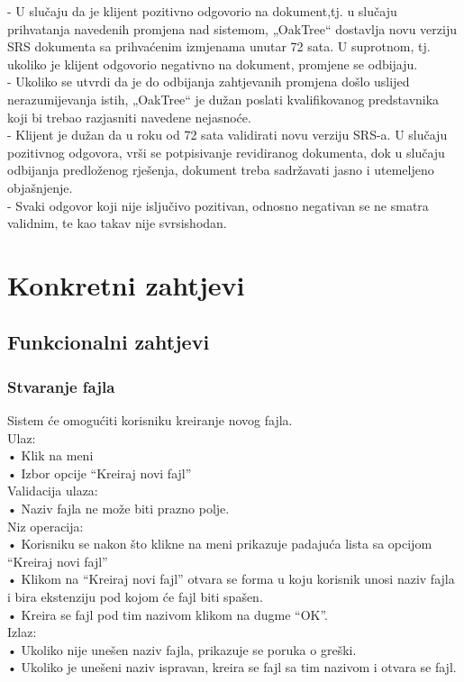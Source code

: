 \documentclass[utf8]{article}
\begin{document}
- U slučaju da  je klijent pozitivno odgovorio na dokument,tj. u slučaju prihvatanja navedenih promjena nad sistemom, „OakTree“ dostavlja novu verziju SRS dokumenta sa prihvaćenim izmjenama unutar 72 sata. U suprotnom, tj. ukoliko je klijent odgovorio negativno na dokument, promjene se odbijaju.  \\
- Ukoliko se utvrdi da je do odbijanja zahtjevanih promjena došlo uslijed nerazumijevanja istih, „OakTree“ je dužan poslati kvalifikovanog predstavnika koji bi trebao razjasniti navedene nejasnoće. \\ 
- Klijent je dužan da u roku od 72 sata validirati novu verziju SRS-a. U slučaju pozitivnog odgovora, vrši se potpisivanje revidiranog dokumenta, dok u slučaju odbijanja predloženog rješenja, dokument treba sadržavati jasno i utemeljeno objašnjenje.  \\
- Svaki odgovor koji nije isljučivo pozitivan, odnosno negativan se ne smatra validnim, te kao takav nije svrsishodan.

\section{Konkretni zahtjevi}
\subsection{Funkcionalni zahtjevi}
\subsubsection{Stvaranje fajla}
Sistem će omogućiti korisniku kreiranje novog fajla.\\
Ulaz: \\
•	Klik na meni \\
•	Izbor opcije “Kreiraj novi fajl” \\
Validacija ulaza: \\
•	Naziv fajla ne može biti prazno polje. \\
Niz operacija: \\
•	Korisniku se nakon što klikne na meni prikazuje padajuća lista sa opcijom “Kreiraj novi fajl” \\
•	Klikom na “Kreiraj novi fajl” otvara se forma u koju korisnik unosi naziv fajla i bira ekstenziju pod kojom će fajl biti spašen. \\
•	Kreira se fajl pod tim nazivom klikom na dugme “OK”. \\
Izlaz: \\
•	Ukoliko nije unešen naziv fajla, prikazuje se poruka o greški. \\
•	Ukoliko je unešeni naziv ispravan, kreira se fajl sa tim nazivom i otvara se fajl.\\
\end{document}
